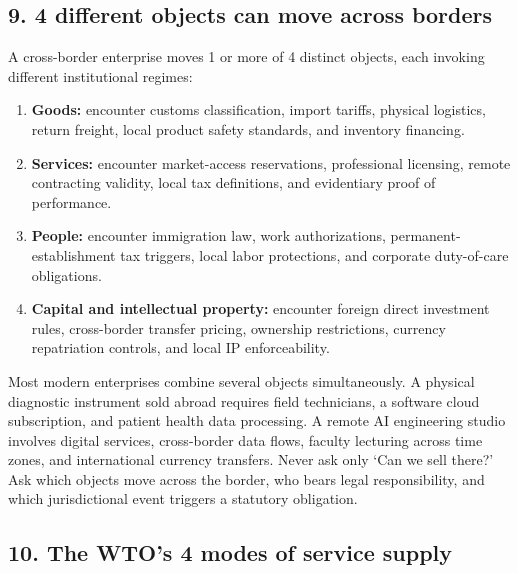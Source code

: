 \subsection{9. 4 different objects can move across borders}

A cross-border enterprise moves 1 or more of 4 distinct objects, each invoking different institutional regimes:
\begin{enumerate}
    \item \textbf{Goods:} encounter customs classification, import tariffs, physical logistics, return freight, local product safety standards, and inventory financing.
    \item \textbf{Services:} encounter market-access reservations, professional licensing, remote contracting validity, local tax definitions, and evidentiary proof of performance.
    \item \textbf{People:} encounter immigration law, work authorizations, permanent-establishment tax triggers, local labor protections, and corporate duty-of-care obligations.
    \item \textbf{Capital and intellectual property:} encounter foreign direct investment rules, cross-border transfer pricing, ownership restrictions, currency repatriation controls, and local IP enforceability.
\end{enumerate}

Most modern enterprises combine several objects simultaneously. A physical diagnostic instrument sold abroad requires field technicians, a software cloud subscription, and patient health data processing. A remote AI engineering studio involves digital services, cross-border data flows, faculty lecturing across time zones, and international currency transfers. Never ask only `Can we sell there?' Ask which objects move across the border, who bears legal responsibility, and which jurisdictional event triggers a statutory obligation.

\subsection{10. The WTO's 4 modes of service supply}

